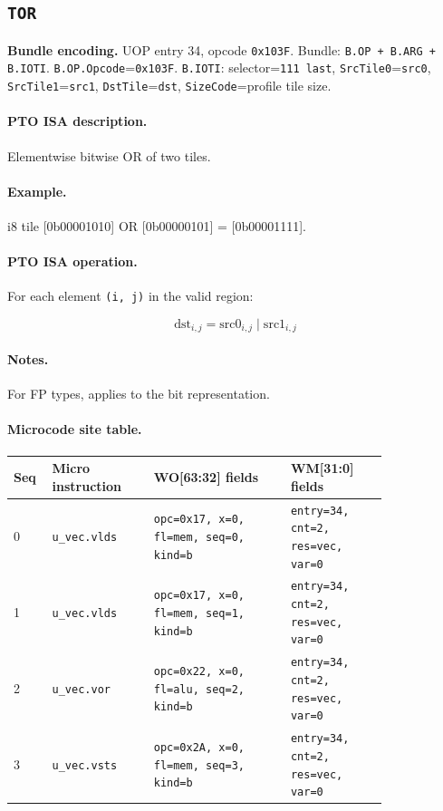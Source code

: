 \subsection{\texttt{TOR}}
\noindent\textbf{Bundle encoding.} UOP entry 34, opcode \texttt{0x103F}. Bundle: \texttt{B.OP + B.ARG + B.IOTI}. \texttt{B.OP.Opcode}=\texttt{0x103F}. \texttt{B.IOTI}: selector=\texttt{111 last}, \texttt{SrcTile0}=\texttt{src0}, \texttt{SrcTile1}=\texttt{src1}, \texttt{DstTile}=\texttt{dst}, \texttt{SizeCode}=profile tile size.\par\smallskip
{\small
\paragraph{PTO ISA description.}
Elementwise bitwise OR of two tiles.
\paragraph{Example.}
i8 tile [0b00001010] OR [0b00000101] = [0b00001111].
\par\smallskip
\paragraph{PTO ISA operation.}
For each element \texttt{(i, j)} in the valid region:

\[
\mathrm{dst}_{i,j} = \mathrm{src0}_{i,j} \;|\; \mathrm{src1}_{i,j}
\]
}\par\smallskip
\paragraph{Notes.}
For FP types, applies to the bit representation.
\paragraph{Microcode site table.}
{\scriptsize
\begin{longtable}{@{}R{0.055\linewidth}L{0.23\linewidth}L{0.31\linewidth}L{0.22\linewidth}@{}}
\toprule
Seq & Micro instruction & WO[63:32] fields & WM[31:0] fields \\
 & \texttt{u\_vec.vlds} & \texttt{opc=0x17, x=0, fl=mem, seq=0, kind=b} & \texttt{entry=34, cnt=2, res=vec, var=0} \\
1 & \texttt{u\_vec.vlds} & \texttt{opc=0x17, x=0, fl=mem, seq=1, kind=b} & \texttt{entry=34, cnt=2, res=vec, var=0} \\
2 & \texttt{u\_vec.vor} & \texttt{opc=0x22, x=0, fl=alu, seq=2, kind=b} & \texttt{entry=34, cnt=2, res=vec, var=0} \\
3 & \texttt{u\_vec.vsts} & \texttt{opc=0x2A, x=0, fl=mem, seq=3, kind=b} & \texttt{entry=34, cnt=2, res=vec, var=0} \\
\bottomrule
\end{longtable}
}

